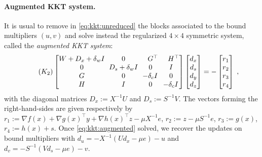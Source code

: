 \paragraph{Augmented KKT system.}
It is usual to remove in \eqref{eq:kkt:unreduced} the blocks associated
to the bound multipliers $(u, v)$ and solve instead the regularized
$4 \times 4$ symmetric system, called the \emph{augmented KKT system}:
\begin{equation}
  \label{eq:kkt:augmented}
  \tag{$K_2$}
  \setlength\arraycolsep{3pt}
  \begin{bmatrix}
    W + D_x + \delta_w I & 0   & \phantom{-}G^\top           & \phantom{-}H^\top           \\
      0       & D_s + \delta_w I  & \phantom{-}0\phantom{^\top} & \phantom{-}I\phantom{^\top} \\
      G       & 0   & -\delta_c I  & \phantom{-}0\phantom{^\top} \\
    H       & I   & \phantom{-}0\phantom{^\top} & -\delta_c I
  \end{bmatrix}
  \begin{bmatrix}
    d_x \\
    d_s \\
    d_y \\
    d_z
  \end{bmatrix}
  = - \begin{bmatrix}
    r_1 \\ r_2 \\ r_3 \\ r_4
  \end{bmatrix} \; ,
\end{equation}
with the diagonal matrices $D_x := X^{-1} U$ and $D_s := S^{-1} V$.
The vectors forming the right-hand-sides are given respectively by
$r_1 := \nabla f(x) + \nabla g(x)^\top y + \nabla h(x)^\top z - \mu X^{-1} e$,
$r_2 := z - \mu S^{-1} e$,
$r_3 := g(x)$,
$r_4 := h(x) + s$.
Once \eqref{eq:kkt:augmented} solved, we recover the updates on bound multipliers with
$d_u = - X^{-1}(U d_x - \mu e) - u$ and
$d_v = - S^{-1}(V d_s - \mu e) - v$.

